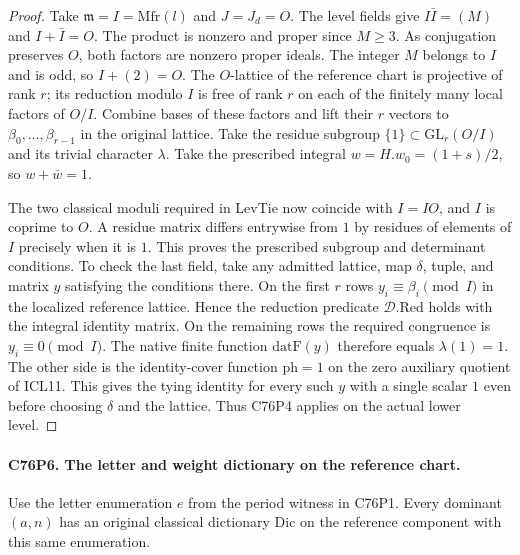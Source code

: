 \begin{proof}
Take $\mathfrak m=I=\mathrm{Mfr}(l)$ and $J=J_d=O$.
The level fields give $I\bar I=(M)$ and $I+\bar I=O$.
The product is nonzero and proper since $M\ge3$. As conjugation
preserves $O$, both factors are nonzero proper ideals. The integer
$M$ belongs to $I$ and is odd, so $I+(2)=O$. The $O$-lattice of
the reference chart is projective of rank $r$; its reduction modulo
$I$ is free of rank $r$ on each of the finitely many local factors
of $O/I$. Combine bases of these factors and lift their $r$ vectors
to $\beta_0,\ldots,\beta_{r-1}$ in the original lattice.
Take the residue subgroup $\{1\}\subset\mathrm{GL}_r(O/I)$
and its trivial character $\lambda$. Take the prescribed integral
$w=H.w_0=(1+s)/2$, so $w+\bar w=1$.

The two classical moduli required in $\mathrm{LevTie}$ now coincide
with $I=IO$, and $I$ is coprime to $O$. A residue matrix differs
entrywise from $1$ by residues of elements of $I$ precisely when
it is $1$. This proves the prescribed subgroup and determinant
conditions. To check the last field, take any admitted lattice,
map $\delta$, tuple, and matrix $y$ satisfying the conditions
there. On the first $r$ rows $y_i\equiv\beta_i\pmod I$
in the localized reference lattice. Hence the reduction predicate
$\mathcal D.\mathrm{Red}$ holds with the integral identity matrix.
On the remaining rows the required congruence is $y_i\equiv0\pmod I$.
The native finite function $\mathrm{datF}(y)$ therefore equals
$\lambda(1)=1$. The other side is the identity-cover function
$\mathrm{ph}=1$ on the zero auxiliary quotient of ICL11.
This gives the tying identity for every such $y$ with a single
scalar $1$ even before choosing $\delta$ and the lattice. Thus
C76P4 applies on the actual lower level.
\end{proof}

\paragraph{C76P6. The letter and weight dictionary on the reference chart.}
Use the letter enumeration $e$ from the period witness in C76P1.
Every dominant $(a,n)$ has an original classical dictionary
$\mathrm{Dic}$ on the reference component with this same enumeration.

